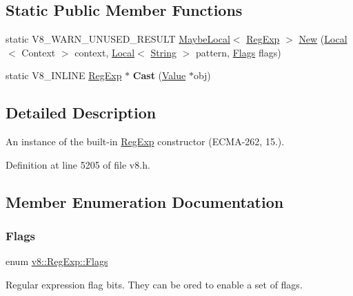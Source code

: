 \subsection*{Static Public Member Functions}
\begin{DoxyCompactItemize}
\item 
static V8\+\_\+\+W\+A\+R\+N\+\_\+\+U\+N\+U\+S\+E\+D\+\_\+\+R\+E\+S\+U\+LT \mbox{\hyperlink{classv8_1_1MaybeLocal}{Maybe\+Local}}$<$ \mbox{\hyperlink{classv8_1_1RegExp}{Reg\+Exp}} $>$ \mbox{\hyperlink{classv8_1_1RegExp_a70ef0ef612099975b84304236736135e}{New}} (\mbox{\hyperlink{classv8_1_1Local}{Local}}$<$ Context $>$ context, \mbox{\hyperlink{classv8_1_1Local}{Local}}$<$ \mbox{\hyperlink{classv8_1_1String}{String}} $>$ pattern, \mbox{\hyperlink{classv8_1_1RegExp_aa4718a5c1f18472aff3bf51ed694fc5a}{Flags}} flags)
\item 
\mbox{\label{classv8_1_1RegExp_ab3f85572312815cbdf5ee368d358c40f}} 
static V8\+\_\+\+I\+N\+L\+I\+NE \mbox{\hyperlink{classv8_1_1RegExp}{Reg\+Exp}} $\ast$ {\bfseries Cast} (\mbox{\hyperlink{classv8_1_1Value}{Value}} $\ast$obj)
\end{DoxyCompactItemize}


\subsection{Detailed Description}
An instance of the built-\/in \mbox{\hyperlink{classv8_1_1RegExp}{Reg\+Exp}} constructor (E\+C\+M\+A-\/262, 15.). 

Definition at line 5205 of file v8.\+h.



\subsection{Member Enumeration Documentation}
\mbox{\label{classv8_1_1RegExp_aa4718a5c1f18472aff3bf51ed694fc5a}} 
\subsubsection{\texorpdfstring{Flags}{Flags}}
{\footnotesize\ttfamily enum \mbox{\hyperlink{classv8_1_1RegExp_aa4718a5c1f18472aff3bf51ed694fc5a}{v8\+::\+Reg\+Exp\+::\+Flags}}}

Regular expression flag bits. They can be or\textquotesingle{}ed to enable a set of flags. 

